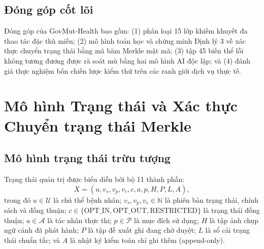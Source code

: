 \documentclass[11pt]{article}
\begin{document}
\subsection{Đóng góp cốt lõi}
Đóng góp của GovMut-Health bao gồm: (1) phân loại 15 lớp khiếm khuyết đa thao tác đặc thù miền; (2) mô hình toán học và chứng minh Định lý 3 về xác thực chuyển trạng thái bằng mã băm Merkle mật mã; (3) tập 45 biến thể lỗi không tương đương được rà soát mù bằng hai mô hình AI độc lập; và (4) đánh giá thực nghiệm bốn chiến lược kiểm thử trên các ranh giới dịch vụ thực tế.

\section{Mô hình Trạng thái và Xác thực Chuyển trạng thái Merkle}
\label{sec:state_model}
\subsection{Mô hình trạng thái trừu tượng}
Trạng thái quản trị được biểu diễn bởi bộ 11 thành phần:
\begin{equation}
X = (u, v_s, v_p, v_c, c, a, p, H, P, L, A),
\end{equation}
trong đó $u \in \mathcal{U}$ là chủ thể bệnh nhân; $v_s, v_p, v_c \in \mathbb{N}$ là phiên bản trạng thái, chính sách và đồng thuận; $c \in \{\text{OPT\_IN}, \text{OPT\_OUT}, \text{RESTRICTED}\}$ là trạng thái đồng thuận; $a \in \mathcal{A}$ là tác nhân thực thi; $p \in \mathcal{P}$ là mục đích sử dụng; $H$ là tập ảnh chụp ngữ cảnh đã phát hành; $P$ là tập đề xuất ghi đang chờ duyệt; $L$ là sổ cái trạng thái chuẩn tắc; và $A$ là nhật ký kiểm toán chỉ ghi thêm (append-only).
\end{document}
